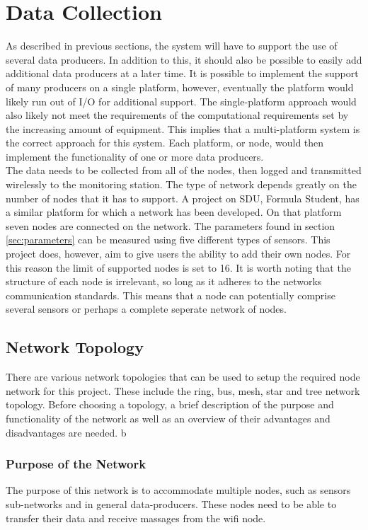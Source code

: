 
\section{Data Collection}
\label{sec:data_collection}
As described in previous sections, the system will have to support the use of several data producers.
In addition to this, it should also be possible to easily add additional data producers at a later time.
It is possible to implement the support of many producers on a single platform, however, eventually the platform would likely run out of I/O for additional support.
The single-platform approach would also likely not meet the requirements of the computational requirements set by the increasing amount of equipment.
This implies that a multi-platform system is the correct approach for this system.
Each platform, or node, would then implement the functionality of one or more data producers.\\
The data needs to be collected from all of the nodes, then logged and transmitted wirelessly to the monitoring station.
The type of network depends greatly on the number of nodes that it has to support.
A project on SDU, Formula Student, has a similar platform for which a network has been developed.
On that platform seven nodes are connected on the network.
The parameters found in section \ref{sec:parameters} can be measured using five different types of sensors.
This project does, however, aim to give users the ability to add their own nodes.
For this reason the limit of supported nodes is set to 16.
It is worth noting that the structure of each node is irrelevant, so long as it adheres to the networks communication standards.
This means that a node can potentially comprise several sensors or perhaps a complete seperate network of nodes.

\subsection{Network Topology}

There are various network topologies that can be used to setup the required node network for this project.
These include the ring, bus, mesh, star and tree network topology. 
Before choosing a topology, a brief description of the purpose and functionality of the network as well as an overview of their advantages and disadvantages are needed. 
b
\subsubsection{Purpose of the Network}
The purpose of this network is to accommodate multiple nodes, such as sensors sub-networks and in general data-producers.
These nodes need to be able to transfer their data and receive massages from the wifi node.

